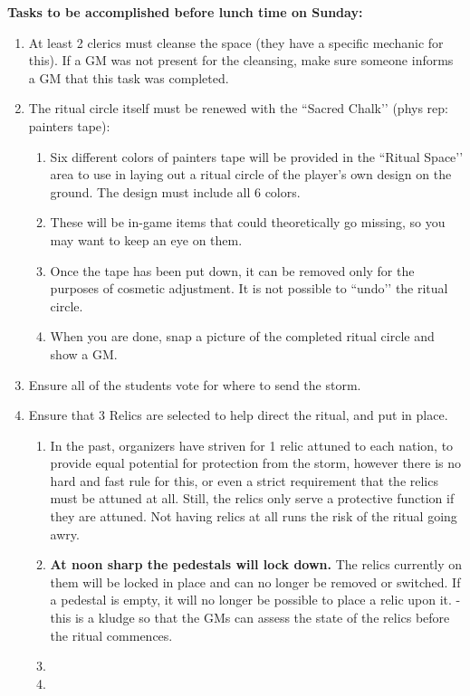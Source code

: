 \documentclass[green]{GL2020}
\begin{document}
\textbf{Tasks to be accomplished before lunch time on Sunday:}
\begin{enumerate}
  \item At least 2 clerics must cleanse the space (they have a specific mechanic for this). If a GM was not present for the cleansing, make sure someone informs a GM that this task was completed.
  \item The ritual circle itself must be renewed with the ``Sacred Chalk’’ (phys rep: painters tape):
  \begin{enumerate}
    \item Six different colors of painters tape will be provided in the ``Ritual Space’’ area to use in laying out a ritual circle of the player’s own design on the ground. The design must include all 6 colors.
    \item These will be in-game items that could theoretically go missing, so you may want to keep an eye on them.
    \item Once the tape has been put down, it can be removed only for the purposes of cosmetic adjustment. It is not possible to ``undo’’ the ritual circle.
    \item When you are done, snap a picture of the completed ritual circle and show a GM.
  \end{enumerate}
  \item Ensure all of the students vote for where to send the storm.
  \item Ensure that 3 Relics are selected to help direct the ritual, and put in place.
  \begin{enumerate}
    \item In the past, organizers have striven for 1 relic attuned to each nation, to provide equal potential for protection from the storm, however there is no hard and fast rule for this, or even a strict requirement that the relics must be attuned at all. Still, the relics only serve a protective function if they are attuned. Not having relics at all runs the risk of the ritual going awry.
    \item \textbf{At noon sharp the pedestals will lock down.} The relics currently on them will be locked in place and can no longer be removed or switched. If a pedestal is empty, it will no longer be possible to place a relic upon it. - this is a kludge so that the GMs can assess the state of the relics before the ritual commences.
    \item 
    \item 
  \end{enumerate}
\end{enumerate}
\end{document}
